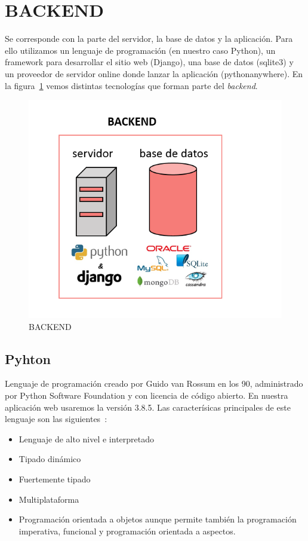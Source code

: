 \documentclass[a4paper, 12pt]{book}
\begin{document}
\section{BACKEND}
Se corresponde con la parte del servidor, la base de datos y la aplicación. Para ello utilizamos un lenguaje de programación (en nuestro caso Python), un framework para desarrollar el sitio web (Django), una base de datos (sqlite3) y un proveedor de  servidor  online donde lanzar la aplicación (pythonanywhere). En la figura~\ref{figura:backend} vemos distintas tecnologías que forman parte del \textit{backend}.
\begin{figure}[h]
        \centering
        \includegraphics[scale=0.6]{img/backend.png}
        \caption{BACKEND}
        \label{figura:backend}
\end{figure}
\subsection{Pyhton}
Lenguaje de programación creado por Guido van Rossum en los 90, administrado por Python Software Foundation y con licencia de código abierto. En nuestra aplicación web usaremos la versión 3.8.5. Las caracterísicas principales de este lenguaje son las siguientes~\cite{gonzalez2014python}:
\begin{itemize}
    \item Lenguaje de alto nivel e interpretado
    \item Tipado dinámico 
    \item Fuertemente tipado
    \item Multiplataforma
    \item Programación orientada a objetos aunque permite también la programación imperativa, funcional y programación orientada a aspectos.
\end{itemize}
\end{document}
